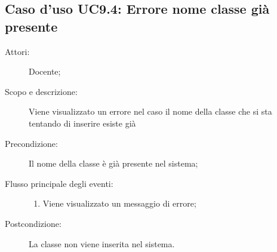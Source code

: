 \subsection{Caso d'uso UC9.4: Errore nome classe già presente}\begin{description}
\item[Attori:] Docente;
\item[Scopo e descrizione:] Viene visualizzato un errore nel caso il nome della classe che si sta tentando di inserire esiste già
      \item[Precondizione:] Il nome della classe è già presente nel sistema;

        \item[Flusso principale degli eventi:] \begin{enumerate}
          \item Viene visualizzato un messaggio di errore;

      \end{enumerate}
    \item[Postcondizione:] La classe non viene inserita nel sistema.
  \end{description}
\hypertarget{UC10}{}
